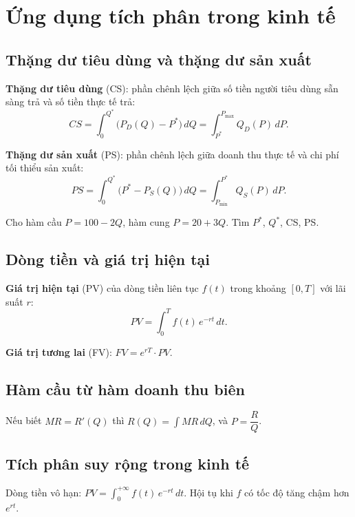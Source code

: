 \documentclass[12pt,a4paper]{article}
\begin{document}
\section{Ứng dụng tích phân trong kinh tế}

\subsection{Thặng dư tiêu dùng và thặng dư sản xuất}

\begin{dinhnghia}
  \textbf{Thặng dư tiêu dùng} (CS): phần chênh lệch giữa số tiền người tiêu dùng sẵn sàng trả và số tiền thực tế trả:
  \[
    CS = \int_0^{Q^*} \bigl(P_D(Q) - P^*\bigr)\,dQ = \int_{P^*}^{P_{\max}} Q_D(P)\,dP.
  \]
\end{dinhnghia}

\begin{dinhnghia}
  \textbf{Thặng dư sản xuất} (PS): phần chênh lệch giữa doanh thu thực tế và chi phí tối thiểu sản xuất:
  \[
    PS = \int_0^{Q^*} \bigl(P^* - P_S(Q)\bigr)\,dQ = \int_{P_{\min}}^{P^*} Q_S(P)\,dP.
  \]
\end{dinhnghia}

\begin{vidu}
  Cho hàm cầu $P = 100 - 2Q$, hàm cung $P = 20 + 3Q$. Tìm $P^*$, $Q^*$, CS, PS.
\end{vidu}

\subsection{Dòng tiền và giá trị hiện tại}

\begin{dinhnghia}
  \textbf{Giá trị hiện tại} (PV) của dòng tiền liên tục $f(t)$ trong khoảng $[0,T]$ với lãi suất $r$:
  \[
    PV = \int_0^T f(t)\,e^{-rt}\,dt.
  \]
\end{dinhnghia}

\begin{dinhnghia}
  \textbf{Giá trị tương lai} (FV): $FV = e^{rT} \cdot PV$.
\end{dinhnghia}

\subsection{Hàm cầu từ hàm doanh thu biên}

\begin{phuongphap}
  Nếu biết $MR = R'(Q)$ thì $R(Q) = \displaystyle\int MR\,dQ$, và $P = \dfrac{R}{Q}$.
\end{phuongphap}

\subsection{Tích phân suy rộng trong kinh tế}

\begin{dinhnghia}
  Dòng tiền vô hạn: $PV = \displaystyle\int_0^{+\infty} f(t)\,e^{-rt}\,dt$. Hội tụ khi $f$ có tốc độ tăng chậm hơn $e^{rt}$.
\end{dinhnghia}
\end{document}
